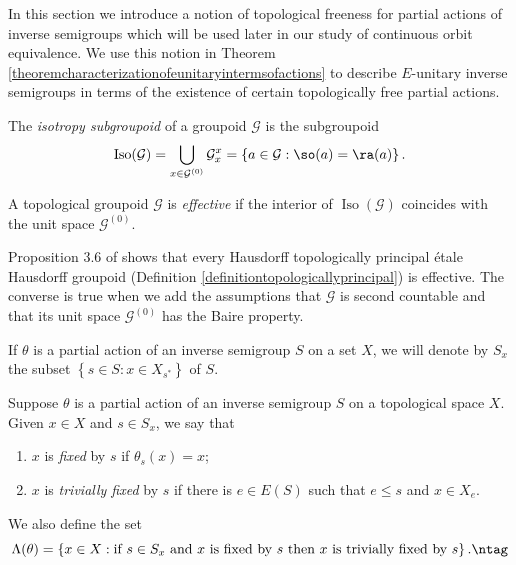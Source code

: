 In this section we introduce a notion of topological freeness for partial actions of inverse semigroups which will be used later in our study of continuous orbit equivalence. We use this notion in Theorem \ref{theoremcharacterizationofeunitaryintermsofactions} to describe $E$-unitary inverse semigroups in terms of the existence of certain topologically free partial actions.

\begin{definition}
The \emph{isotropy subgroupoid} of a groupoid $\mathcal{G}$ is the subgroupoid
\[\operatorname{Iso}(\mathcal{G})=\bigcup_{x\in\mathcal{G}^{(0)}}\mathcal{G}_x^x=\left\{a\in\mathcal{G}:\so(a)=\ra(a)\right\}.\]
\end{definition}

\begin{definition}[{\cite{MR2460017}}]\label{definitioneffective}
A topological groupoid $\mathcal{G}$ is \emph{effective} if the interior of $\operatorname{Iso}(\mathcal{G})$ coincides with the unit space $\mathcal{G}^{(0)}$.
\end{definition}

Proposition 3.6 of \cite{MR2460017} shows that every Hausdorff topologically principal étale Hausdorff groupoid (Definition \ref{definitiontopologicallyprincipal}) is effective. The converse is true when we add the assumptions that $\mathcal{G}$ is second countable and that its unit space $\mathcal{G}^{(0)}$ has the Baire property.

If $\theta$ is a partial action of an inverse semigroup $S$ on a set $X$, we will denote by $S_x$ the subset $\left\{s\in S:x\in X_{s^*}\right\}$ of $S$.

\begin{definition}[{\cite[Definition 4.1]{MR3448414}}]
Suppose $\theta$ is a partial action of an inverse semigroup $S$ on a topological space $X$. Given $x\in X$ and $s\in S_x$, we say that
\begin{enumerate}
\item $x$ is \emph{fixed} by $s$ if $\theta_s(x)=x$;
\item $x$ is \emph{trivially fixed} by $s$ if there is $e\in E(S)$ such that $e\leq s$ and $x\in X_e$.
\end{enumerate}
We also define the set
\[\Lambda(\theta)=\left\{x\in X:\text{if }s\in S_x\text{ and }x\text{ is fixed by }s\text{ then }x\text{ is trivially fixed by }s\right\}.
\ntag\label{equationdefinitionlambda}\]%
\end{definition}

